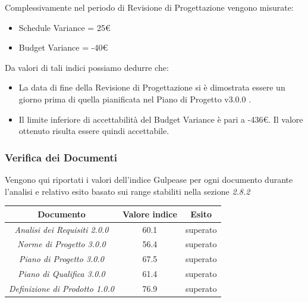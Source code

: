 {  Complessivamente nel periodo di Revisione di Progettazione vengono misurate:
  \begin{itemize}
  \item Schedule Variance = 25€
  \item Budget Variance = -40€
  \end{itemize}

  Da valori di tali indici possiamo dedurre che:
  \begin{itemize}
  \item La data di fine della Revisione di Progettazione si è dimostrata essere un
    giorno prima di quella pianificata nel Piano di Progetto v3.0.0 .
  \item  Il limite inferiore di accettabilità del Budget Variance è pari a -436€.
    Il valore ottenuto risulta essere quindi accettabile. 
  \end{itemize}


  \subsubsection{Verifica dei Documenti}
  Vengono qui riportati i valori dell’indice Gulpease per ogni documento durante l’analisi e relativo
  esito basato sui range stabiliti nella sezione \emph{2.8.2}
  \begin{center}
    \begin{tabular}{|c|c|c|}
      \hline
      \textbf{Documento} & \textbf{Valore indice} & \textbf{Esito} \\
      \hline
      \emph{Analisi dei Requisiti 2.0.0}  & 60.1 & superato \\
      \hline
      \emph{Norme di Progetto 3.0.0}   & 56.4  & superato \\
      \hline
      \emph{Piano di Progetto 3.0.0}   & 67.5 & superato \\
      \hline
      \emph{Piano di Qualifica 3.0.0}   & 61.4 & superato \\
      \hline
      \emph{Definizione di Prodotto 1.0.0}  & 76.9 & superato \\
      \hline
    \end{tabular}
  \end{center}
  
}
